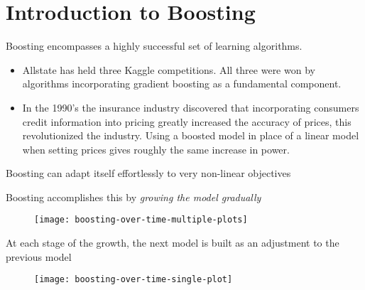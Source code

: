 \section{Introduction to Boosting}
%
\begin{frame}
  Boosting encompasses a highly successful set of learning algorithms.
  
  \begin{itemize}
    \item Allstate has held three Kaggle competitions.  All three were won by algorithms incorporating gradient boosting as a fundamental component.
    \item In the 1990's the insurance industry discovered that incorporating consumers credit information into pricing greatly increased the accuracy of prices, this revolutionized the industry.  Using a boosted model in place of a linear model when setting prices gives roughly the same increase in power.
  \end{itemize}
\end{frame}
%
\begin{frame}
Boosting can adapt itself effortlessly to very non-linear objectives
\end{frame}
%
\begin{frame}
Boosting accomplishes this by \textit{growing the model gradually}
  \begin{figure}
    \texttt{[image: boosting-over-time-multiple-plots]}
  \end{figure}
\end{frame}
%
\begin{frame}
At each stage of the growth, the next model is built as an adjustment to the previous model
  \begin{figure}
    \texttt{[image: boosting-over-time-single-plot]}
  \end{figure}
\end{frame}
